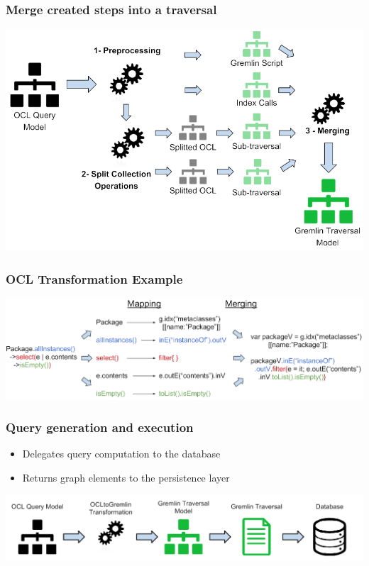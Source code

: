 \documentclass[10pt]{beamer}
\begin{document}
\begin{frame}[c]\frametitle{Merge created steps into a traversal}
  \begin{center}
    \includegraphics[width=\textwidth]{mogwai-transformation.png}
  \end{center}
\end{frame}

\begin{frame}[c]\frametitle{OCL Transformation Example}
  \begin{center}
    \includegraphics[width=\textwidth]{mogwai-ocl-transformation.png}
  \end{center}	
\end{frame}

\begin{frame}[c]\frametitle{Query generation and execution}
	
	\begin{itemize}
	\item Delegates query computation to the database
	\item Returns graph elements to the persistence layer
	\end{itemize}
	
  \begin{center}
    \includegraphics[width=\textwidth]{mogwai-architecture.png}
  \end{center}
	
\end{frame}
\end{document}
